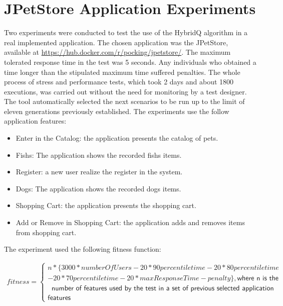
\section{JPetStore Application Experiments}

Two experiments were conducted to test the use of the HybridQ algorithm in a real implemented application. The chosen application was the JPetStore, available at \url{https://hub.docker.com/r/pocking/jpetstore/}. The maximum tolerated response time in the test was 5 seconds.  Any  individuals who obtained a time longer than the stipulated maximum time suffered penalties.  The whole process of stress and performance tests, which took 2 days and about 1800 executions, was carried out without the need for monitoring by a test designer. The tool automatically selected the next scenarios to be run up to the limit of eleven generations previously established. The experiments use the follow application features:


\begin{itemize}
\item Enter in the Catalog: the application presents the catalog of pets.
\item Fishs: The application shows the recorded fishs items.
\item Register:  a new user realize the register in the system.
\item Dogs: The application shows the recorded dogs items.
\item Shopping Cart: the application presents the shopping cart.
\item Add or Remove in Shopping Cart: the application adds and removes items from shopping cart.
\end{itemize}


The experiment used the following fitness function:

\begin{equation}
\begin{aligned}
fitness=\begin{cases} n*\{3000*numberOfUsers-20* 90percentiletime-20*80percentiletime\\-20*70percentiletime
-20*maxResponseTime-penalty\} , \textsf{where n is the }\\\ \textsf{ number of features used by the test in a set of previous selected application} \\ \textsf{features}
\end{cases}
\end{aligned}
\end{equation}


